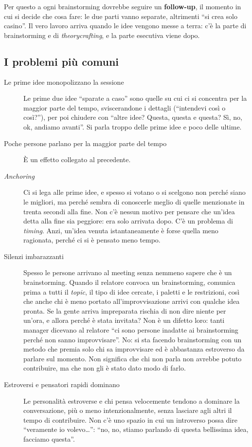 Per questo a ogni brainstorming dovrebbe seguire un \textbf{follow-up}, il momento in
cui si decide che cosa fare: le due parti vanno separate, altrimenti ``si crea solo
casino''. Il vero lavoro arriva quando le idee vengono messe a terra: c'è la parte di
brainstorming e di \emph{theorycrafting}, e la parte esecutiva viene dopo.

\subsection{I problemi più comuni}

\begin{description}
  \item[Le prime idee monopolizzano la sessione] Le prime due idee ``sparate a
        caso'' sono quelle su cui ci si concentra per la maggior parte del tempo,
        sviscerandone i dettagli (``intendevi così o così?''), per poi chiudere con
        ``altre idee? Questa, questa e questa? Sì, no, ok, andiamo avanti''. Si
        parla troppo delle prime idee e poco delle ultime.
  \item[Poche persone parlano per la maggior parte del tempo] È un effetto
        collegato al precedente.
  \item[\emph{Anchoring}] Ci si lega alle prime idee, e spesso si votano o si
        scelgono non perché siano le migliori, ma perché sembra di conoscerle meglio
        di quelle menzionate in trenta secondi alla fine. Non c'è nessun motivo per
        pensare che un'idea detta alla fine sia peggiore: era solo arrivata dopo.
        C'è un problema di \emph{timing}. Anzi, un'idea venuta istantaneamente è
        forse quella meno ragionata, perché ci si è pensato meno tempo.
  \item[Silenzi imbarazzanti] Spesso le persone arrivano al meeting senza nemmeno
        sapere che è un brainstorming. Quando il relatore convoca un brainstorming,
        comunica prima a tutti il \emph{topic}, il tipo di idee cercate, i paletti e
        le restrizioni, così che anche chi è meno portato all'improvvisazione arrivi
        con qualche idea pronta. Se la gente arriva impreparata rischia di non dire
        niente per un'ora, e allora perché è stata invitata? Non è un difetto loro:
        tanti manager dicevano al relatore ``ci sono persone inadatte ai
        brainstorming perché non sanno improvvisare''. No: si sta facendo
        brainstorming con un metodo che premia solo chi sa improvvisare ed è
        abbastanza estroverso da parlare sul momento. Non significa che chi non
        parla non avrebbe potuto contribuire, ma che non gli è stato dato modo di
        farlo.
  \item[Estroversi e pensatori rapidi dominano] Le personalità estroverse e chi
        pensa velocemente tendono a dominare la conversazione, più o meno
        intenzionalmente, senza lasciare agli altri il tempo di contribuire. Non c'è
        uno spazio in cui un introverso possa dire ``veramente io volevo\dots'':
        ``no, no, stiamo parlando di questa bellissima idea, facciamo questa''.
\end{description}

